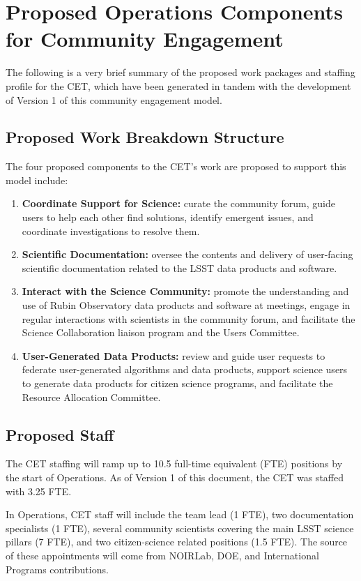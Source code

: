 \documentclass[DM,lsstdraft,toc]{lsstdoc}
\begin{document}
\section{Proposed Operations Components for Community Engagement}

The following is a very brief summary of the proposed work packages and staffing profile for the CET, which have been generated in tandem with the development of Version 1 of this community engagement model.


\subsection{Proposed Work Breakdown Structure}

The four proposed components to the CET's work are proposed to support this model include:
\begin{enumerate}
\item \textbf{Coordinate Support for Science:} curate the community forum, guide users to help each other find solutions, identify emergent issues, and coordinate investigations to resolve them.
\item \textbf{Scientific Documentation:} oversee the contents and delivery of user-facing scientific documentation related to the LSST data products and software. 
\item \textbf{Interact with the Science Community:} promote the understanding and use of Rubin Observatory data products and software at meetings, engage in regular interactions with scientists in the community forum, and facilitate the Science Collaboration liaison program and the Users Committee.
\item \textbf{User-Generated Data Products:} review and guide user requests to federate user-generated algorithms and data products, support science users to generate data products for citizen science programs, and facilitate the Resource Allocation Committee.
\end{enumerate}


\subsection{Proposed Staff}

The CET staffing will ramp up to 10.5 full-time equivalent (FTE) positions by the start of Operations.
As of Version 1 of this document, the CET was staffed with 3.25 FTE.

In Operations, CET staff will include the team lead (1 FTE), two documentation specialists (1 FTE), several community scientists covering the main LSST science pillars (7 FTE), and two citizen-science related positions (1.5 FTE). 
The source of these appointments will come from NOIRLab, DOE, and International Programs contributions.
\end{document}
